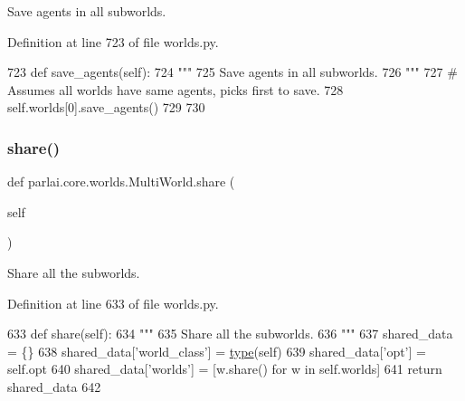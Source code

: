 \begin{DoxyVerb}Save agents in all subworlds.
\end{DoxyVerb}
 

Definition at line 723 of file worlds.\+py.


\begin{DoxyCode}
723     \textcolor{keyword}{def }save\_agents(self):
724         \textcolor{stringliteral}{"""}
725 \textcolor{stringliteral}{        Save agents in all subworlds.}
726 \textcolor{stringliteral}{        """}
727         \textcolor{comment}{# Assumes all worlds have same agents, picks first to save.}
728         self.worlds[0].save\_agents()
729 
730 
\end{DoxyCode}
\mbox{\label{classparlai_1_1core_1_1worlds_1_1MultiWorld_ae780a8cfd7c6b675727cca24b8321015}} 
\subsubsection{\texorpdfstring{share()}{share()}}
{\footnotesize\ttfamily def parlai.\+core.\+worlds.\+Multi\+World.\+share (\begin{DoxyParamCaption}\item[{}]{self }\end{DoxyParamCaption})}

\begin{DoxyVerb}Share all the subworlds.
\end{DoxyVerb}
 

Definition at line 633 of file worlds.\+py.


\begin{DoxyCode}
633     \textcolor{keyword}{def }share(self):
634         \textcolor{stringliteral}{"""}
635 \textcolor{stringliteral}{        Share all the subworlds.}
636 \textcolor{stringliteral}{        """}
637         shared\_data = \{\}
638         shared\_data[\textcolor{stringliteral}{'world\_class'}] = \hyperlink{namespaceparlai_1_1agents_1_1tfidf__retriever_1_1build__tfidf_ad5dfae268e23f506da084a9efb72f619}{type}(self)
639         shared\_data[\textcolor{stringliteral}{'opt'}] = self.opt
640         shared\_data[\textcolor{stringliteral}{'worlds'}] = [w.share() \textcolor{keywordflow}{for} w \textcolor{keywordflow}{in} self.worlds]
641         \textcolor{keywordflow}{return} shared\_data
642 
\end{DoxyCode}


